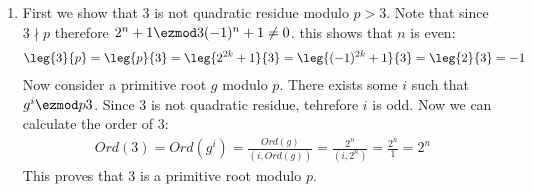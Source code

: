\begin{enumerate}[label=]
    \item 
        First we show that $3$ is not quadratic residue modulo $p > 3$. Note that since $3 \nmid p$ therefore $2^n + 1 \ezmod 3 (-1)^n + 1 \ne 0$. this shows that $n$ is even: 
        \begin{gather*}
            \leg{3}{p} = \leg{p}{3} = \leg{2^{2k} + 1}{3} = \leg{(-1)^{2k} + 1}{3}= \leg{2}{3} = -1
        \end{gather*}
        Now consider a primitive root $g$ modulo $p$. There exists some $i$ such that $g^i \ezmod p 3$.
        Since $3$ is not quadratic residue, tehrefore $i$ is odd. Now we can calculate the order of $3$:
        \begin{gather*}
            Ord(3) = Ord(g^i) = \frac{Ord(g)}{(i, Ord(g))} = \frac{2^n}{(i, 2^n)} = \frac{2^n}{1} = 2^n
        \end{gather*}
        This proves that 3 is a primitive root modulo $p$.
\end{enumerate}